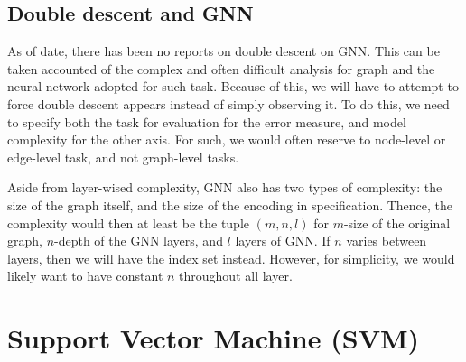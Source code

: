 \subsection{Double descent and GNN}

As of date, there has been no reports on double descent on GNN. This can be taken accounted of the complex and often difficult analysis for graph and the neural network adopted for such task. Because of this, we will have to attempt to force double descent appears instead of simply observing it. To do this, we need to specify both the task for evaluation for the error measure, and model complexity for the other axis. For such, we would often reserve to node-level or edge-level task, and not graph-level tasks. 

Aside from layer-wised complexity, GNN also has two types of complexity: the size of the graph itself, and the size of the encoding in specification. Thence, the complexity would then at least be the tuple $(m,n,l)$ for $m$-size of the original graph, $n$-depth of the GNN layers, and $l$ layers of GNN. If $n$ varies between layers, then we will have the index set instead. However, for simplicity, we would likely want to have constant $n$ throughout all layer. 

\clearpage

\section{Support Vector Machine (SVM)}



